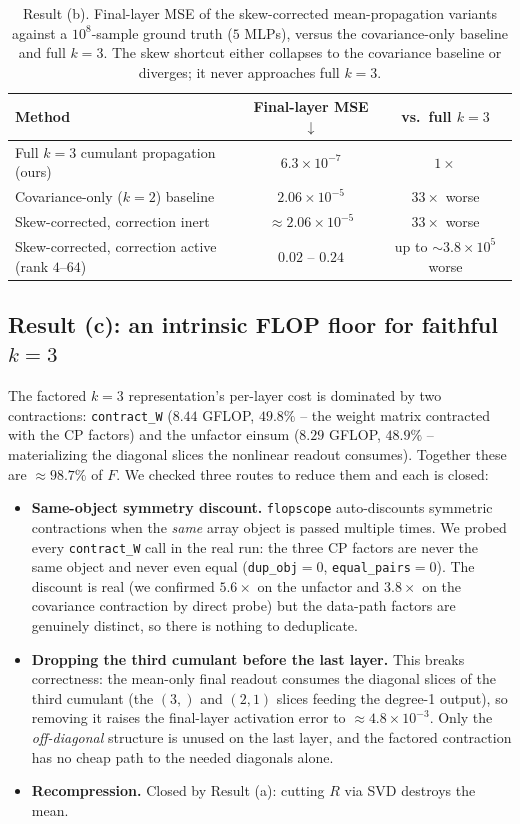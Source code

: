 \documentclass[11pt]{article}
\theoremstyle{remark}
\begin{document}
\begin{table}[t]
\centering
\caption{Result (b). Final-layer MSE of the skew-corrected mean-propagation
variants against a $10^8$-sample ground truth ($5$ MLPs), versus the
covariance-only baseline and full $k{=}3$. The skew shortcut either collapses to
the covariance baseline or diverges; it never approaches full $k{=}3$.}
\label{tab:skew}
\small
\begin{tabular}{lcc}
\toprule
Method & Final-layer MSE $\downarrow$ & vs.\ full $k{=}3$ \\
\midrule
Full $k{=}3$ cumulant propagation (ours)            & $6.3\times10^{-7}$ & $1\times$ \\
Covariance-only ($k{=}2$) baseline                   & $2.06\times10^{-5}$ & $33\times$ worse \\
Skew-corrected, correction inert                     & $\approx2.06\times10^{-5}$ & $33\times$ worse \\
Skew-corrected, correction active (rank $4$--$64$)   & $0.02$ -- $0.24$ & up to $\sim\!3.8\times10^{5}$ worse \\
\bottomrule
\end{tabular}
\end{table}

\subsection{Result (c): an intrinsic FLOP floor for faithful $k{=}3$}
\label{sec:floor}

The factored $k{=}3$ representation's per-layer cost is dominated by two
contractions: \texttt{contract\_W} ($8.44$ GFLOP, $49.8\%$ -- the weight matrix
contracted with the CP factors) and the unfactor einsum ($8.29$ GFLOP, $48.9\%$
-- materializing the diagonal slices the nonlinear readout consumes). Together
these are $\approx 98.7\%$ of $F$. We checked three routes to reduce them and
each is closed:
\begin{itemize}
  \item \textbf{Same-object symmetry discount.} \texttt{flopscope} auto-discounts
  symmetric contractions when the \emph{same} array object is passed multiple
  times. We probed every \texttt{contract\_W} call in the real run: the three CP
  factors are never the same object and never even equal
  (\texttt{dup\_obj}$=0$, \texttt{equal\_pairs}$=0$). The discount is real
  (we confirmed $5.6\times$ on the unfactor and $3.8\times$ on the
  covariance contraction by direct probe) but the data-path factors are
  genuinely distinct, so there is nothing to deduplicate.
  \item \textbf{Dropping the third cumulant before the last layer.} This breaks
  correctness: the mean-only final readout consumes the diagonal slices of the
  third cumulant (the $(3,)$ and $(2,1)$ slices feeding the degree-1 output), so
  removing it raises the final-layer activation error to $\approx 4.8\times
  10^{-3}$. Only the \emph{off-diagonal} structure is unused on the last layer,
  and the factored contraction has no cheap path to the needed diagonals alone.
  \item \textbf{Recompression.} Closed by Result (a): cutting $R$ via SVD
  destroys the mean.
\end{itemize}
\end{document}
